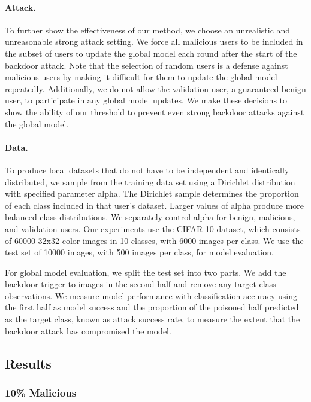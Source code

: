 \documentclass{article} %
\begin{document}
\paragraph{Attack.} To further show the effectiveness of our method, we choose an unrealistic and unreasonable strong attack setting. We force all malicious users to be included in the subset of users to update the global model each round after the start of the backdoor attack. Note that the selection of random users is a defense against malicious users by making it difficult for them to update the global model repeatedly. Additionally, we do not allow the validation user, a guaranteed benign user, to participate in any global model updates. We make these decisions to show the ability of our threshold to prevent even strong backdoor attacks against the global model. 


\paragraph{Data.} To produce local datasets that do not have to be independent and identically distributed, we sample from the training data set using a Dirichlet distribution with specified parameter alpha. The Dirichlet sample determines the proportion of each class included in that user's dataset. Larger values of alpha produce more balanced class distributions. We separately control alpha for benign, malicious, and validation users. Our experiments use the CIFAR-10 dataset, which consists of 60000 32x32 color images in 10 classes, with 6000 images per class. We use the test set of 10000 images, with 500 images per class, for model evaluation. 

For global model evaluation, we split the test set into two parts. We add the backdoor trigger to images in the second half and remove any target class observations. We measure model performance with classification accuracy using the first half as model success and the proportion of the poisoned half predicted as the target class, known as attack success rate, to measure the extent that the backdoor attack has compromised the model.


%
\pagebreak
\subsection{Results}
\subsubsection{10\% Malicious}
\end{document}

